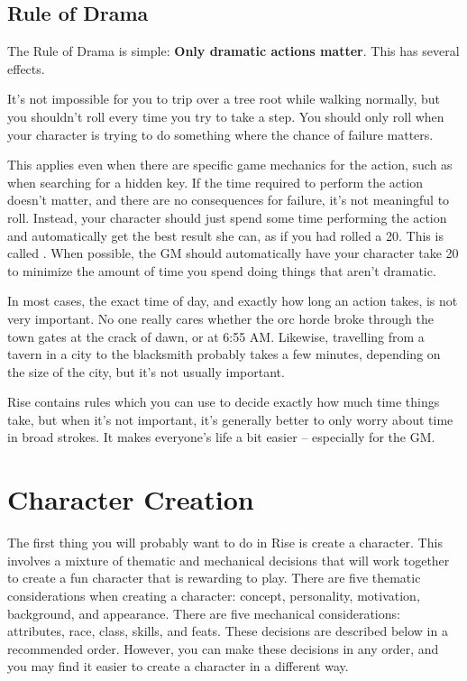 \subsection{Rule of Drama}

The Rule of Drama is simple: \textbf{Only dramatic actions matter}.
This has several effects.

 It's not impossible for you to trip over a tree root while walking normally, but you shouldn't roll every time you try to take a step.
You should only roll when your character is trying to do something where the chance of failure matters.

This applies even when there are specific game mechanics for the action, such as when searching for a hidden key.
If the time required to perform the action doesn't matter, and there are no consequences for failure, it's not meaningful to roll.
Instead, your character should just spend some time performing the action and automatically get the best result she can, as if you had rolled a 20.
This is called .
When possible, the GM should automatically have your character take 20 to minimize the amount of time you spend doing things that aren't dramatic.

 In most cases, the exact time of day, and exactly how long an action takes, is not very important.
No one really cares whether the orc horde broke through the town gates at the crack of dawn, or at 6:55 AM.
Likewise, travelling from a tavern in a city to the blacksmith probably takes a few minutes, depending on the size of the city, but it's not usually important.

Rise contains rules which you can use to decide exactly how much time things take, but when it's not important, it's generally better to only worry about time in broad strokes.
It makes everyone's life a bit easier -- especially for the GM.

\section{Character Creation}

The first thing you will probably want to do in Rise is create a character.
This involves a mixture of thematic and mechanical decisions that will work together to create a fun character that is rewarding to play.
There are five thematic considerations when creating a character: concept, personality, motivation, background, and appearance.
There are five mechanical considerations: attributes, race, class, skills, and feats.
These decisions are described below in a recommended order.
However, you can make these decisions in any order, and you may find it easier to create a character in a different way.  

